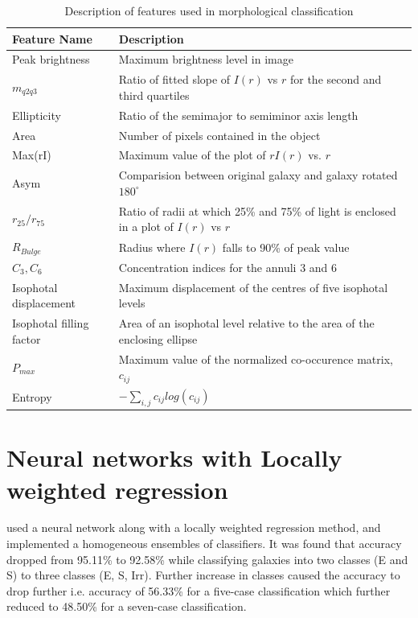 \documentclass[a4paper,12pt]{report}
\begin{document}
\begin{table}[t]
\centering
\tiny
\begin{tabular}{p{4cm} l} 
\hline
\hline
 Feature Name & Description\\ 
 \hline
 Peak brightness\dotfill & Maximum brightness level in image\\ 
 $m_{q2q3}$\dotfill & Ratio of fitted slope of $I(r)$ vs $r$ for the second and third quartiles\\
 Ellipticity\dotfill & Ratio of the semimajor to semiminor axis length\\
 Area\dotfill & Number of pixels contained in the object\\
 Max(rI)\dotfill & Maximum value of the plot of $rI(r)$ vs. $r$\\
 Asym\dotfill & Comparision between original galaxy and galaxy rotated $180^{\circ}$\\
 $r_25/r_75$\dotfill & Ratio of radii at which 25\% and 75\% of light is enclosed in a plot of $I(r)$ vs $r$\\
 $R_{Bulge}$\dotfill & Radius where $I(r)$ falls to 90\% of peak value\\
 $C_3, C_6$\dotfill & Concentration indices for the annuli 3 and 6\\
 Isophotal displacement\dotfill & Maximum displacement of the centres of five isophotal levels\\
 Isophotal filling factor\dotfill & Area of an isophotal level relative to the area of the enclosing ellipse\\
 $P_{max}$\dotfill & Maximum value of the normalized co-occurence matrix, $c_{ij}$\\
 Entropy\dotfill & $-\sum_{i,j}{c_{ij} log{(c_{ij})}}$\\
 \hline
\end{tabular}
    \caption{Description of features used in morphological classification}
    \label{features_morphological}
\end{table} 

\vspace{3\baselineskip}
\section{Neural networks with Locally weighted regression}
\hspace*{0.5 in}\cite{De_La_Calleja2004} used a neural network along with a locally weighted regression method, and implemented a homogeneous ensembles of classifiers. It was found that accuracy dropped from 95.11\% to 92.58\% while classifying galaxies into two classes (E and S) to three classes (E, S, Irr). Further increase in classes caused the accuracy to drop further i.e. accuracy of 56.33\% for a five-case classification which further reduced to 48.50\% for a seven-case classification.
\end{document}
